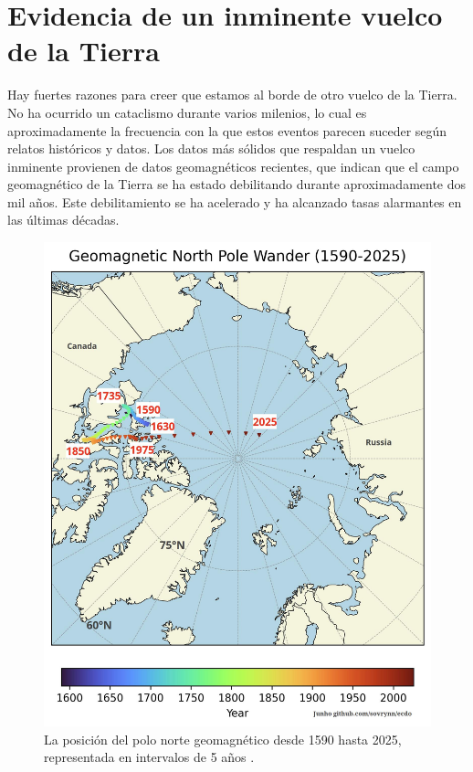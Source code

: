 \documentclass[10pt,twocolumn,letterpaper]{article}
\begin{document}
\section{Evidencia de un inminente vuelco de la Tierra}

Hay fuertes razones para creer que estamos al borde de otro vuelco de la Tierra. No ha ocurrido un cataclismo durante varios milenios, lo cual es aproximadamente la frecuencia con la que estos eventos parecen suceder según relatos históricos y datos. Los datos más sólidos que respaldan un vuelco inminente provienen de datos geomagnéticos recientes, que indican que el campo geomagnético de la Tierra se ha estado debilitando durante aproximadamente dos mil años. Este debilitamiento se ha acelerado y ha alcanzado tasas alarmantes en las últimas décadas.

\begin{figure}[t]
\begin{center}
   \includegraphics[width=1\linewidth]{npw.jpg}
\end{center}
   \caption{La posición del polo norte geomagnético desde 1590 hasta 2025, representada en intervalos de 5 años \cite{142}.}
\label{fig:13}
\label{fig:onecol}
\end{figure}
\end{document}

